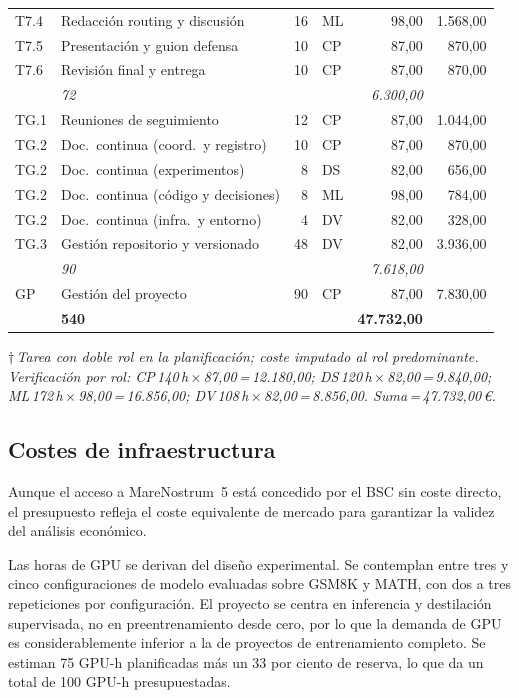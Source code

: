 \documentclass[11pt,a4paper]{article}
\begin{document}
{\begin{tabularx}{\textwidth}{>{\ttfamily}l >{\raggedright\arraybackslash}X r l r r}
T7.4 & Redacción routing y discusión & 16 & ML & 98,00 & 1.568,00 \\
T7.5 & Presentación y guion defensa & 10 & CP & 87,00 & 870,00 \\
T7.6 & Revisión final y entrega & 10 & CP & 87,00 & 870,00 \\
\multicolumn{2}{r}{\textit{Subtotal F7}} & \textit{72} & & & \textit{6.300,00} \\
\addlinespace[1.5pt]
TG.1 & Reuniones de seguimiento & 12 & CP & 87,00 & 1.044,00 \\
TG.2 & Doc.\ continua (coord.\ y registro) & 10 & CP & 87,00 & 870,00 \\
TG.2 & Doc.\ continua (experimentos) & 8 & DS & 82,00 & 656,00 \\
TG.2 & Doc.\ continua (código y decisiones) & 8 & ML & 98,00 & 784,00 \\
TG.2 & Doc.\ continua (infra.\ y entorno) & 4 & DV & 82,00 & 328,00 \\
TG.3 & Gestión repositorio y versionado & 48 & DV & 82,00 & 3.936,00 \\
\multicolumn{2}{r}{\textit{Subtotal TG}} & \textit{90} & & & \textit{7.618,00} \\
\addlinespace[1.5pt]
GP & Gestión del proyecto & 90 & CP & 87,00 & 7.830,00 \\
\midrule
\multicolumn{2}{r}{\textbf{TOTAL CPA}} & \textbf{540} & & & \textbf{47.732,00} \\
\end{tabularx}
}

\noindent\textit{\scriptsize $\dagger$\,Tarea con doble rol en la planificación; coste imputado al rol predominante. Verificación por rol: CP\,140\,h\,$\times$\,87,00\,=\,12.180,00; DS\,120\,h\,$\times$\,82,00\,=\,9.840,00; ML\,172\,h\,$\times$\,98,00\,=\,16.856,00; DV\,108\,h\,$\times$\,82,00\,=\,8.856,00. Suma\,=\,47.732,00\,\euro{}.}

\subsection{Costes de infraestructura}

Aunque el acceso a MareNostrum~5 está concedido por el BSC sin coste directo, el presupuesto refleja el coste equivalente de mercado para garantizar la validez del análisis económico.

Las horas de GPU se derivan del diseño experimental. Se contemplan entre tres y cinco configuraciones de modelo evaluadas sobre GSM8K y MATH, con dos a tres repeticiones por configuración. El proyecto se centra en inferencia y destilación supervisada, no en preentrenamiento desde cero, por lo que la demanda de GPU es considerablemente inferior a la de proyectos de entrenamiento completo. Se estiman 75 GPU-h planificadas más un 33 por ciento de reserva, lo que da un total de 100 GPU-h presupuestadas.
\end{document}
